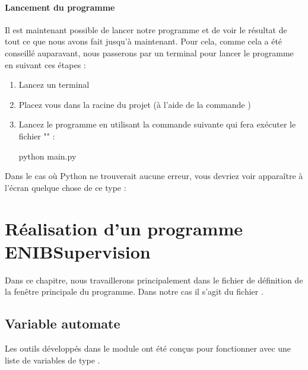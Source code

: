 \subsubsection{Lancement du programme}
\label{tag-startProgFromCmdLine}
Il est maintenant possible de lancer notre programme et de voir le résultat de tout ce que nous avons fait jusqu'à maintenant.\newline
Pour cela, comme cela a été conseillé auparavant, nous passerons par un terminal pour lancer le programme en suivant ces étapes :
\begin{enumerate}
\item Lancez un terminal
    
\item Placez vous dans la racine du projet (à l'aide de la commande )
    
\item Lancez le programme en utilisant la commande suivante qui fera exécuter le fichier "" :
\begin{Python}
    python main.py
\end{Python}
\end{enumerate}



Dans le cas où Python ne trouverait aucune erreur, vous devriez voir apparaître à l'écran quelque chose de ce type :





\chapter{Réalisation d'un programme ENIBSupervision}

Dans ce chapitre, nous travaillerons principalement dans le fichier de définition de la fenêtre principale du programme. Dans notre cas il s'agit du fichier .\\




\section{Variable automate}

Les outils développés dans le module  ont été conçus pour fonctionner avec une liste de variables de type .\\

